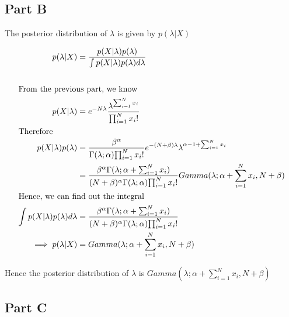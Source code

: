 \documentclass{article}
\begin{document}
\begin{addmargin}{1.5em}
    \subsection*{Part B}
    \begin{addmargin}{1.5em}
        
        The posterior distribution of $\lambda$ is given by $p(\lambda | X)$
        
        \begin{align*}
            p(\lambda | X)                         &= \frac{p(X | \lambda)p(\lambda)}{\int p(X | \lambda)p(\lambda) d\lambda} \\\\
            \shortintertext{From the previous part, we know}
            p(X | \lambda)                         &= e^{-N\lambda} \frac{\lambda^{\sum_{i = 1}^{N} x_i}}{\prod_{i = 1}^{N} x_i!} \\
            \shortintertext{Therefore}
            p(X | \lambda)p(\lambda)               &= \frac{\beta^\alpha}{\Gamma(\lambda; \alpha){\prod_{i = 1}^{N} x_i!}}e^{-(N + \beta)\lambda}\lambda^{\alpha - 1 + \sum_{i = 1}^{N} x_i} \\
                                                   &= \frac{\beta^\alpha\Gamma(\lambda; \alpha + \sum_{i = 1}^{N} x_i)}{(N + \beta)^\alpha\Gamma(\lambda; \alpha){\prod_{i = 1}^{N} x_i!}}Gamma(\lambda; \alpha + \sum_{i = 1}^{N} x_i, N + \beta) \\
            \shortintertext{Hence, we can find out the integral}
            \int p(X | \lambda)p(\lambda) d\lambda &= \frac{\beta^\alpha\Gamma(\lambda; \alpha + \sum_{i = 1}^{N} x_i)}{(N + \beta)^\alpha\Gamma(\lambda; \alpha){\prod_{i = 1}^{N} x_i!}} \\
            \implies p(\lambda | X)                &= Gamma(\lambda; \alpha + \sum_{i = 1}^{N} x_i, N + \beta)
        \end{align*}
        
        Hence the posterior distribution of $\lambda$ is $Gamma(\lambda; \alpha + \sum_{i = 1}^{N} x_i, N + \beta)$
        
    \end{addmargin}
    
    
    
    \subsection*{Part C}
    \begin{addmargin}{1.5em}
        

\end{addmargin}
\end{addmargin}
\end{document}
